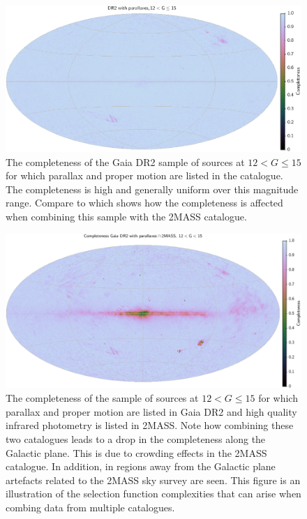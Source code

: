 \begin{figure}
    \centering
    \includegraphics[width=\linewidth]{img/DR2_5P_12to15_CompMap.png}
    \caption{The completeness of the Gaia DR2 sample of sources at $12<G\leq15$ for which parallax and proper motion are listed in the catalogue. The completeness is high and generally uniform over this magnitude range. Compare to  which shows how the completeness is affected when combining this sample with the 2MASS catalogue.}
    \label{fig:g12to15}
\end{figure}

\begin{figure}
    \centering
    \includegraphics[width=\linewidth]{img/DR2_5P_2MASS_CompMap_old.png}
    \caption{The completeness of the sample of sources at $12<G\leq15$ for which parallax and proper motion are listed in Gaia DR2 and high quality infrared photometry is listed in 2MASS. Note how combining these two catalogues leads to a drop in the completeness along the Galactic plane. This is due to crowding effects in the 2MASS catalogue. In addition, in regions away from the Galactic plane artefacts related to the 2MASS sky survey are seen. This figure is an illustration of the selection function complexities that can arise when combing data from multiple catalogues.}
    \label{fig:g12to15_2mass}
\end{figure}

